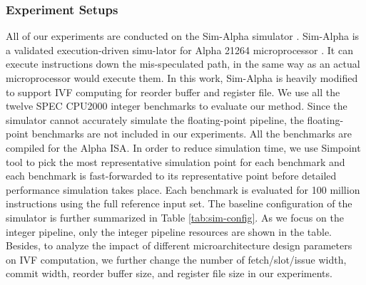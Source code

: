 \subsubsection{Experiment Setups}
All of our experiments are conducted on the Sim-Alpha simulator \cite{desikan2001sim}. Sim-Alpha is a validated execution-driven simu-lator for Alpha 21264 microprocessor \cite{skessler1999alpha}. It can execute instructions down the mis-speculated path, in the same way as an actual microprocessor would execute them. In this work, Sim-Alpha is heavily modified to support IVF computing for reorder buffer and register file. We use all the twelve SPEC CPU2000 integer benchmarks to evaluate our method. Since the simulator cannot accurately simulate the floating-point pipeline, the floating-point benchmarks are not included in our experiments. All the benchmarks are compiled for the Alpha ISA. In order to reduce simulation time, we use Simpoint tool \cite{sherwood2002automatically} to pick the most representative simulation point for each benchmark and each benchmark is fast-forwarded to its representative point before detailed performance simulation takes place. Each benchmark is evaluated for 100 million instructions using the full reference input set. The baseline configuration of the simulator is further summarized in Table \ref{tab:sim-config}. As we focus on the integer pipeline, only the integer pipeline resources are shown in the table. Besides, to analyze the impact of different microarchitecture design parameters on IVF computation, we further change the number of fetch/slot/issue width, commit width, reorder buffer size, and register file size in our experiments.

